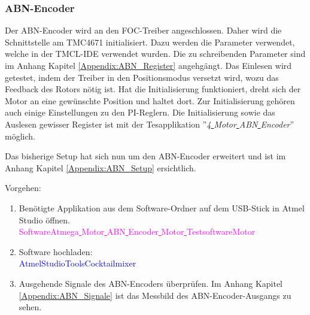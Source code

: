 \newpage
\subsubsection{ABN-Encoder}
\label{subsubsec:Inbetriebnahme_ABN-Encoder}

Der ABN-Encoder wird an den FOC-Treiber angeschlossen. Daher wird die Schnittstelle am TMC4671 initialisiert. Dazu werden die Parameter verwendet, welche in der TMCL-IDE verwendet wurden. Die zu schreibenden Parameter sind im Anhang Kapitel \ref{Appendix:ABN_Register} angehgängt. Das Einlesen wird getestet, indem der Treiber in den Positionsmodus versetzt wird, wozu das Feedback des Rotors nötig ist. Hat die Initialisierung funktioniert, dreht sich der Motor an eine gewünschte Position und haltet dort. Zur Initialisierung gehören auch einige Einstellungen zu den PI-Reglern. Die Initialisierung sowie das Auslesen gewisser Register ist mit der Tesapplikation ''\textit{4\underline{ }Motor\underline{ }ABN\underline{ }Encoder}'' möglich.

Das bisherige Setup hat sich nun um den ABN-Encoder erweitert und ist im Anhang Kapitel \ref{Appendix:ABN_Setup} ersichtlich.

Vorgehen:
\begin{enumerate}
\item Benötigte Applikation aus dem Software-Ordner auf dem USB-Stick in Atmel Studio öffnen.\\
\textcolor{magenta}{Software\textrightarrow Atmega\underline{ }Motor\underline{ }ABN\underline{ }Encoder\underline{ }Motor\underline{ }Testsoftware\textrightarrow Motor}\\

\item Software hochladen:\\
\textcolor{blue}{AtmelStudio\textrightarrow Tools\textrightarrow Cocktailmixer}\\

\item Ausgehende Signale des ABN-Encoders überprüfen. Im Anhang Kapitel \ref{Appendix:ABN_Signale} ist das Messbild des ABN-Encoder-Ausgangs zu sehen.

\end{enumerate}